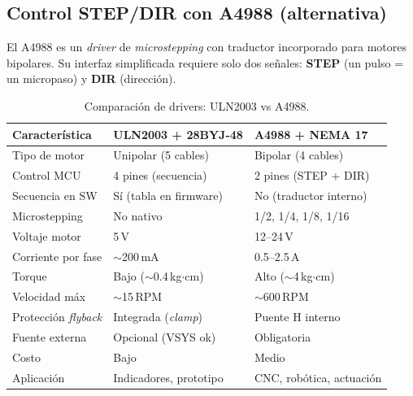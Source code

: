 \documentclass[11pt]{article}
\begin{document}
\subsection{Control STEP/DIR con A4988 (alternativa)}
El A4988 es un \emph{driver} de \emph{microstepping} con traductor incorporado para
motores bipolares. Su interfaz simplificada requiere solo dos señales:
\textbf{STEP} (un pulso = un micropaso) y \textbf{DIR} (dirección).
\begin{table}[H]\centering
\caption{Comparación de drivers: ULN2003 vs A4988.}
\begin{tabular}{lll}
\toprule
Característica & ULN2003 + 28BYJ-48 & A4988 + NEMA 17 \\
\midrule
Tipo de motor & Unipolar (5 cables) & Bipolar (4 cables) \\
Control MCU & 4 pines (secuencia) & 2 pines (STEP + DIR) \\
Secuencia en SW & Sí (tabla en firmware) & No (traductor interno) \\
Microstepping & No nativo & 1/2, 1/4, 1/8, 1/16 \\
Voltaje motor & 5\,V & 12--24\,V \\
Corriente por fase & $\sim$200\,mA & 0.5--2.5\,A \\
Torque & Bajo ($\sim$0.4\,kg$\cdot$cm) & Alto ($\sim$4\,kg$\cdot$cm) \\
Velocidad máx & $\sim$15\,RPM & $\sim$600\,RPM \\
Protección \emph{flyback} & Integrada (\emph{clamp}) & Puente H interno \\
Fuente externa & Opcional (VSYS ok) & Obligatoria \\
Costo & Bajo & Medio \\
Aplicación & Indicadores, prototipo & CNC, robótica, actuación \\
\bottomrule
\end{tabular}
\end{table}
\end{document}
